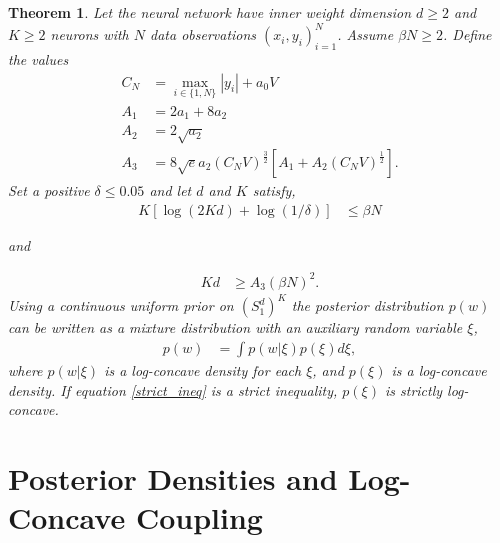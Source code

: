 \documentclass{article}
\numberwithin{equation}{section}
\theoremstyle{Lemma}
\theoremstyle{Corollary}
\theoremstyle{Theorem}
\newtheorem{theorem}{Theorem}
\theoremstyle{Remark}
\begin{document}
\begin{theorem}\label{paper_main_thm}
Let the neural network have inner weight dimension $d \geq 2$ and $K\geq 2$ neurons with $N$ data observations $(x_{i}, y_{i})_{i=1}^{N}$. Assume $\beta N \geq 2$. Define the values
\begin{align}
    C_{N}&= \max_{i \in\{1, N\}} |y_{i}|+a_{0}V\\
 A_{1}&=2a_{1}+8a_{2}\\
    A_{2}&=2 \sqrt{a_{2}}\\
     A_{3}&=  8\sqrt{e}a_{2}(C_{N}V)^{\frac{3}{2}}[A_{1}+A_{2}(C_{N}V)^{\frac{1}{2}}].
\end{align}
Set a positive $\delta \le 0.05$ and let $d$ and $K$ satisfy,
\begin{align}
K[\log(2Kd)+\log(1/\delta)] &\leq \beta N \label{K_ineq}
\end{align}\par\vspace{-0.5cm}
\noindent and
\par\vspace{-0.8cm}
\begin{align}
    Kd &\geq A_{3}(\beta N)^{2}.\label{strict_ineq}
\end{align}
Using a continuous uniform prior on $(S^{d}_{1})^{K}$ the posterior distribution $p(w)$ can be written as a mixture distribution with an auxiliary random variable $\xi$,
\begin{align}
    p(w)&= \int p(w|\xi)p(\xi)d\xi,
\end{align}
where $p(w|\xi)$ is a log-concave density for each $\xi$, and $p(\xi)$ is a log-concave density. If equation \eqref{strict_ineq} is a strict inequality, $p(\xi)$ is strictly log-concave.
\end{theorem}
\section{Posterior Densities and Log-Concave Coupling}\label{log_concave_coupling}
\end{document}
